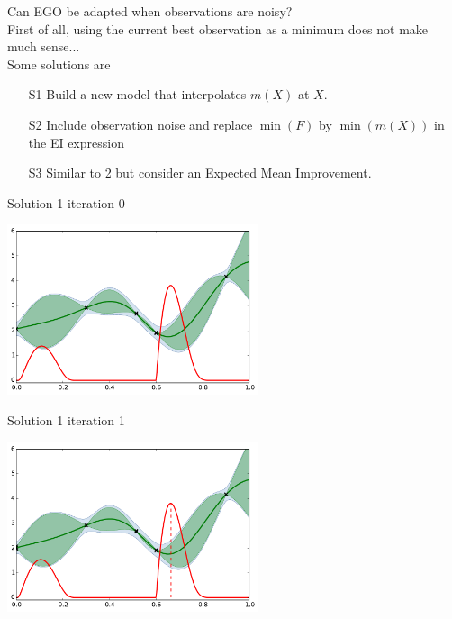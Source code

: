 \begin{frame}{}
Can EGO be adapted when observations are noisy?\\
\vspace{5mm}
First of all, using the current best observation as a minimum does not make much sense...\\
\vspace{5mm}
Some solutions are
\begin{itemize}
	\item[S1] Build a new model that interpolates $m(X)$ at $X$.
	\item[S2] Include observation noise and replace $\min(F)$ by $\min(m(X))$ in the EI expression
	\item[S3] Similar to 2 but consider an Expected Mean Improvement.
\end{itemize}
\end{frame}

\begin{frame}{Solution 1}
iteration 0
\begin{center}
\includegraphics[height=5cm]{4_optimization/figures/python/ego_EI1n0}
\end{center}
\end{frame}

\begin{frame}[noframenumbering]{Solution 1}
iteration 1
\begin{center}
\includegraphics[height=5cm]{4_optimization/figures/python/ego_EI1n1}
\end{center}
\end{frame}

